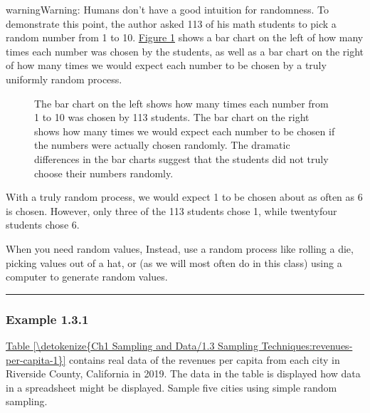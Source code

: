 \documentclass[letterpaper,10pt,english]{jupyterBook}
\begin{document}
\begin{sphinxadmonition}{warning}{Warning:}
\sphinxAtStartPar
Humans don’t have a good intuition for randomness. To demonstrate this point, the author asked 113 of his math students to pick a random number from 1 to 10. \hyperref[\detokenize{Ch1 Sampling and Data/1.3 Sampling Techniques:human-randomness}]{Figure \ref{\detokenize{Ch1 Sampling and Data/1.3 Sampling Techniques:human-randomness}}} shows a bar chart on the left of how many times each number was chosen by the students, as well as a bar chart on the right of how many times we would expect each number to be chosen by a truly uniformly random process.

\begin{figure}[H]
\centering
\capstart

\noindent{}
\caption{The bar chart on the left shows how many times each number from 1 to 10 was chosen by 113 students. The bar chart on the right shows how many times we would expect each number to be chosen if the numbers were actually chosen randomly. The dramatic differences in the bar charts suggest that the students did not truly choose their numbers randomly.}\label{\detokenize{Ch1 Sampling and Data/1.3 Sampling Techniques:human-randomness}}\end{figure}

\sphinxAtStartPar
With a truly random process, we would expect 1 to be chosen about as often as 6 is chosen. However, only three of the 113 students chose 1, while twenty\sphinxhyphen{}four students chose 6.

\sphinxAtStartPar
When you need random values,  Instead, use a random process like rolling a die, picking values out of a hat, or (as we will most often do in this class) using a computer to generate random values.
\end{sphinxadmonition}


\bigskip\hrule\bigskip



\subsubsection{Example 1.3.1}
\label{\detokenize{Ch1 Sampling and Data/1.3 Sampling Techniques:example-1-3-1}}
\sphinxAtStartPar
\hyperref[\detokenize{Ch1 Sampling and Data/1.3 Sampling Techniques:revenues-per-capita-1}]{Table \ref{\detokenize{Ch1 Sampling and Data/1.3 Sampling Techniques:revenues-per-capita-1}}} contains real data of the revenues per capita from each city in Riverside County, California in 2019. The data in the table is displayed how data in a spreadsheet might be displayed. Sample five cities using simple random sampling.
\end{document}
